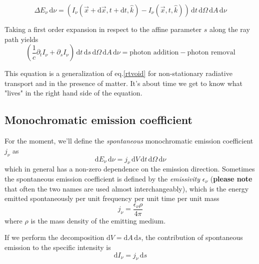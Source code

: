 \begin{equation*}
	\Delta E_{\nu}\,\text{d}\nu = \left(I_{\nu}(\vec{x}+\text{d}\vec{x}, t+\text{d}t, \hat{k})-I_{\nu}(\vec{x}, t, \hat{k})\right)\, \text{d}t \, \text{d}\Omega \, \text{d}A \, \text{d}\nu
\end{equation*}
\par Taking a first order expansion in respect to the affine parameter $s$ along the ray path yields
\begin{equation*}
	\left(\frac{1}{c}\partial_{t}I_{\nu}+\partial_{s}I_{\nu}\right)\, \text{d}t \, \text{d}s\, \text{d}\Omega \, \text{d}A \, \text{d}\nu = \text{photon addition}-\text{photon removal}
\end{equation*}
\par This equation is a generalization of eq.\ref{rtvoid} for non-stationary radiative transport and in the presence of matter. It's about time we get to know what "lives" in the right hand side of the equation.
\subsection*{Monochromatic emission coefficient}
For the moment, we'll define the \emph{spontaneous} monochromatic emission coefficient $j_{\nu}$ as
\begin{equation}
	\text{d}E_{\nu}\,\text{d}\nu = j_{\nu}\,\text{d}V\,\text{d}t \, \text{d}\Omega \, \text{d}\nu
	\label{eq:jnu}
\end{equation}
which in general has a non-zero dependence on the emission direction. Sometimes the spontaneous emission coefficient is defined by the \emph{emissivity} $\epsilon_{\nu}$ (\textbf{please note} that often the two names are used almost interchangeably), which is the energy emitted spontaneously per unit frequency per unit time per unit mass
\begin{equation*}
	j_{\nu} = \frac{\epsilon_{\nu}\rho}{4\pi}
\end{equation*}
where $\rho$ is the mass density of the emitting medium.
\par If we perform the decomposition $\text{d}V = \text{d}A\,\text{d}s$, the contribution of spontaneous emission to the specific intensity is
\begin{equation*}
	\text{d}I_{\nu} = j_{\nu}\,\text{d}s
\end{equation*}
